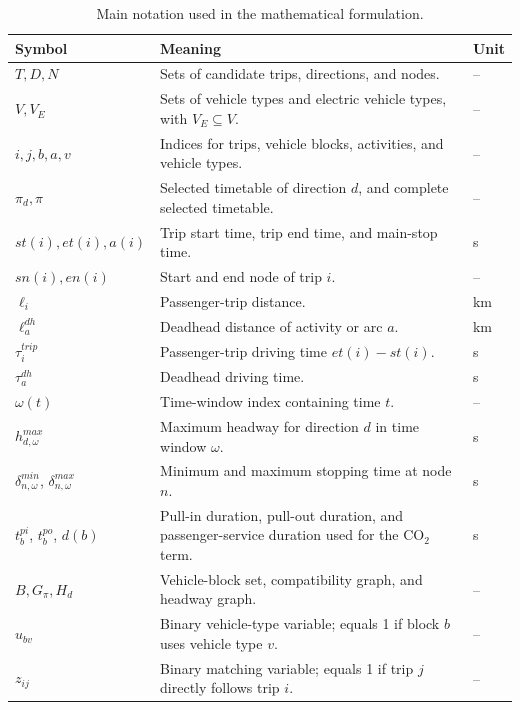 \begin{table}[htbp]
\centering
\caption{Main notation used in the mathematical formulation.}
\label{tab:notation}
\scriptsize
\setlength{\tabcolsep}{3pt}
\renewcommand{\arraystretch}{1.16}
\begin{tabularx}{\textwidth}{@{}>{\RaggedRight\arraybackslash}p{3.75cm}
>{\RaggedRight\arraybackslash}X
>{\RaggedRight\arraybackslash}p{1.05cm}@{}}
\toprule
Symbol & Meaning & Unit \\
\midrule
\(T,D,N\) & Sets of candidate trips, directions, and nodes. & -- \\
\(V,V_E\) & Sets of vehicle types and electric vehicle types, with \(V_E\subseteq V\). & -- \\
\(i,j,b,a,v\) & Indices for trips, vehicle blocks, activities, and vehicle types. & -- \\
\(\pi_d,\pi\) & Selected timetable of direction \(d\), and complete selected timetable. & -- \\
\(st(i),et(i),a(i)\) & Trip start time, trip end time, and main-stop time. & s \\
\(sn(i),en(i)\) & Start and end node of trip \(i\). & -- \\
\(\ell_i\) & Passenger-trip distance. & km \\
\(\ell_a^{dh}\) & Deadhead distance of activity or arc \(a\). & km \\
\(\tau_i^{trip}\) & Passenger-trip driving time \(et(i)-st(i)\). & s \\
\(\tau_a^{dh}\) & Deadhead driving time. & s \\
\(\omega(t)\) & Time-window index containing time \(t\). & -- \\
\(h^{max}_{d,\omega}\) & Maximum headway for direction \(d\) in time window \(\omega\). & s \\
\(\delta^{min}_{n,\omega}\), \(\delta^{max}_{n,\omega}\) & Minimum and maximum stopping time at node \(n\). & s \\
\(t_b^{pi}\), \(t_b^{po}\), \(d(b)\) & Pull-in duration, pull-out duration, and passenger-service duration used for the CO\(_2\) term. & s \\
\(B,G_\pi,H_d\) & Vehicle-block set, compatibility graph, and headway graph. & -- \\
\(u_{bv}\) & Binary vehicle-type variable; equals 1 if block \(b\) uses vehicle type \(v\). & -- \\
\(z_{ij}\) & Binary matching variable; equals 1 if trip \(j\) directly follows trip \(i\). & -- \\

\end{tabularx}
\end{table}
